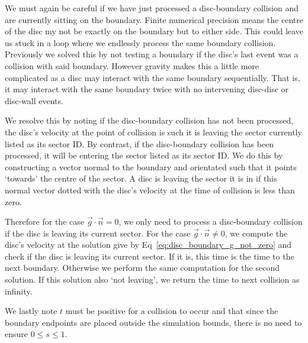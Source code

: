 \documentclass{article}
\begin{document}
We must again be careful if we have just processed a disc-boundary collision and are currently sitting on the boundary. Finite numerical precision means the centre of the disc my not be exactly on the boundary but to either side. This could leave us stuck in a loop where we endlessly process the same boundary collision. Previously we solved this by not testing a boundary if the disc's last event was a collision with said boundary. However gravity makes this a little more complicated as a disc may interact with the same boundary sequentially. That is, it may interact with the same boundary twice with no intervening disc-disc or disc-wall events.

We resolve this by noting if the disc-boundary collision has not been processed, the disc's velocity at the point of collision is such it is leaving the sector currently listed as its sector ID. By contrast, if the disc-boundary collision has been processed, it will be entering the sector listed as its sector ID. We do this by constructing a vector normal to the boundary and orientated such that it points `towards' the centre of the sector. A disc is leaving the sector it is in if this normal vector dotted with the disc's velocity at the time of collision is less than zero. 

Therefore for the case $\vec{g} \cdot \vec{n} = 0$, we only need to process a disc-boundary collision if the disc is leaving its current sector. For the case $\vec{g} \cdot \vec{n} \neq 0$, we compute the disc's velocity at the solution give by Eq~\ref{eq:disc_boundary_g_not_zero} and check if the disc is leaving its current sector. If it is, this time is the time to the next boundary. Otherwise we perform the same computation for the second solution. If this solution also `not leaving', we return the time to next collision as infinity.

We lastly note $t$ must be positive for a collision to occur and that since the boundary endpoints are placed outside the simulation bounds, there is no need to ensure $0 \leq s \leq 1$.
\end{document}
